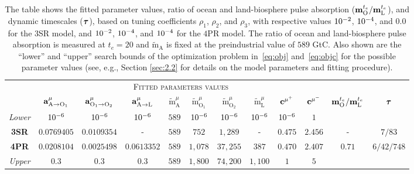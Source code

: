\documentclass[11pt, a4paper, pdftex, twoside, dvipsnames]{article}
\renewcommand{\ref}{\cref}
\newcommand{\bb}[1]{\boldsymbol{\bold{#1}}}
\newcommand{\bbt}[1]{\tilde{\boldsymbol{\mathrm{#1}}}}
\newcommand{\expnum}[2]{
\ifnum#1=1 
  10^{#2} 
\else 
  #1 \! \cdot \! 10^{#2}
\fi
}
\begin{document}
\begin{table}[t]
\setlength{\tabcolsep}{5pt}
\centering
\small
\begin{tabular}{cccccccccc||cc}
& 
\multicolumn{9}{c}{\textsc{Fitted parameters values}} &  \\
&
	$\bb{a}^{\mu}_{\text{A}   \to \text{O}_1}$ & 
	$\bb{a}^{\mu}_{\text{O}_1 \to \text{O}_2}$ & 
	$\bb{a}^{\mu}_{\text{A}   \to \text{L}  }$ &
	$\bbt{m}^{\mu}_{\text{A}}$    &
	$\bbt{m}^{\mu}_{\text{O}_1}$  &
	$\bbt{m}^{\mu}_{\text{O}_2}$  &
	$\bbt{m}^{\mu}_{\text{L}}$   &
	$\bb{c}^{\mu^+}$ &
	$\bb{c}^{\mu^-}$ &
$\bb{m}_{\text{O}}^{t_e}/\bb{m}_{\text{L}}^{t_e} $ & 
$\bb{\tau}$
\\[4pt]
%
\toprule
\toprule
\textit{Lower}& ${\expnum{1}{-6}}$ & ${\expnum{1}{-6}}$  & ${\expnum{1}{-6}}$ & ${589}$ &  ${\expnum{1}{-6}}$    & ${\expnum{1}{-6}}$  & ${\expnum{1}{-6}}$ & ${\expnum{1}{-6}}$  & ${1}$ &  &\\
\textbf{3SR} & $\num{0.0769405}$ & $\num{0.0109354}$ & - & $589$ & $752 $    & $1,\!289 $  & - & $0.475$ & $2.456$ & - & $7/83$ \\
\textbf{4PR} & $\num{0.0208104}$ & $\num{0.0025498}$ & $\num{0.0613352}$ & $589$ & $1,\!078$ & $37,\!255$ & $387 $ & $0.470$ & $2.407$ & $0.71$&$6/42/748$\\
\textit{Upper}& ${0.3}$ & ${0.3}$ & ${0.3}$  & ${589}$ & ${1,800}$ & ${74,\!200}$ & ${1,\!100}$ & ${1}$ & ${5}$ &  &\\
\end{tabular}
\caption{
The table shows the fitted parameter values, ratio of ocean and land-biosphere pulse absorption ($\bb{m}_{\text{O}}^{t_e}/\bb{m}_{\text{L}}^{t_e} $), and dynamic timescales ($\bb{\tau}$), based on tuning coefficients $\rho_1$, $\rho_2$, and $\rho_3$, with respective values $\expnum{1}{-2}$, $\expnum{1}{-4}$, and $0.0$ for the $3$SR model, and $\expnum{1}{-2}$, $\expnum{1}{-4}$, and $\expnum{1}{-4}$ for the $4$PR model.
%
The ratio of ocean and land-biosphere pulse absorption is measured at $t_e=20$ and $\bbt{m}_{\text{A}}$ is fixed at the preindustrial value of $589$ GtC. 
%
Also shown are the ``lower'' and ``upper'' search bounds of the optimization problem in~\eqref{eq:obj} and~\eqref{eq:objc} for the possible parameter values (see, e.g., Section \ref{sec:2.2} for details on the model parameters and fitting procedure).
}
\label{tab:1}
\end{table}
\end{document}
